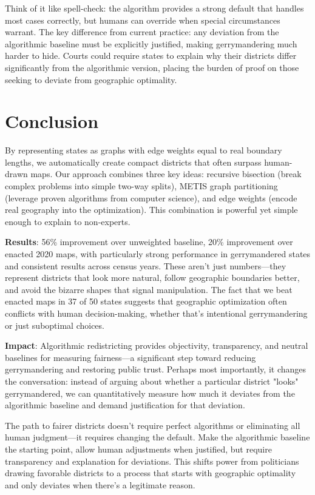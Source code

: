 \documentclass[11pt]{article}
\begin{document}
Think of it like spell-check: the algorithm provides a strong default that handles most cases correctly, but humans can override when special circumstances warrant. The key difference from current practice: any deviation from the algorithmic baseline must be explicitly justified, making gerrymandering much harder to hide. Courts could require states to explain why their districts differ significantly from the algorithmic version, placing the burden of proof on those seeking to deviate from geographic optimality.

\section{Conclusion}

By representing states as graphs with edge weights equal to real boundary lengths, we automatically create compact districts that often surpass human-drawn maps. Our approach combines three key ideas: recursive bisection (break complex problems into simple two-way splits), METIS graph partitioning (leverage proven algorithms from computer science), and edge weights (encode real geography into the optimization). This combination is powerful yet simple enough to explain to non-experts.

\textbf{Results}: 56\% improvement over unweighted baseline, 20\% improvement over enacted 2020 maps, with particularly strong performance in gerrymandered states and consistent results across census years. These aren't just numbers—they represent districts that look more natural, follow geographic boundaries better, and avoid the bizarre shapes that signal manipulation. The fact that we beat enacted maps in 37 of 50 states suggests that geographic optimization often conflicts with human decision-making, whether that's intentional gerrymandering or just suboptimal choices.

\textbf{Impact}: Algorithmic redistricting provides objectivity, transparency, and neutral baselines for measuring fairness—a significant step toward reducing gerrymandering and restoring public trust. Perhaps most importantly, it changes the conversation: instead of arguing about whether a particular district "looks" gerrymandered, we can quantitatively measure how much it deviates from the algorithmic baseline and demand justification for that deviation.

The path to fairer districts doesn't require perfect algorithms or eliminating all human judgment—it requires changing the default. Make the algorithmic baseline the starting point, allow human adjustments when justified, but require transparency and explanation for deviations. This shifts power from politicians drawing favorable districts to a process that starts with geographic optimality and only deviates when there's a legitimate reason.
\end{document}
